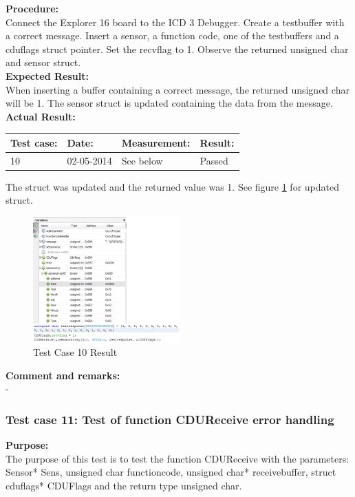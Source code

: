 \textbf{Procedure:}\\
Connect the Explorer 16 board to the ICD 3 Debugger. Create a testbuffer with a correct message. Insert a sensor, a function code, one of the testbuffers and a cduflags struct pointer. Set the recvflag to 1. Observe the returned unsigned char and sensor struct.\\

\textbf{Expected Result:}\\
When inserting a buffer containing a correct message, the returned unsigned char will be 1. The sensor struct is updated containing the data from the message.\\

\textbf{Actual Result:}\\
\begin{table}[H]
\centering
\begin{tabular}{|p{2cm}|p{2cm}|p{3cm}|p{2cm}|}\hline
\textbf{Test case:} & \textbf{Date:} & \textbf{Measurement:} & \textbf{Result:} \\ \hline
10 & 02-05-2014 & See below & Passed \\ \hline
\end{tabular}
\end{table}
The struct was updated and the returned value was 1. See figure \ref{fig:cdutestcase10} for updated struct.\\
\begin{figure}[H]
\centering
\includegraphics[width=0.5\textwidth]{billeder/CDUtestcase10}
\caption{Test Case 10 Result}
\label{fig:cdutestcase10}
\end{figure}

\textbf{Comment and remarks:}\\
-\\

\subsubsection{Test case 11: Test of function CDUReceive error handling }
\textbf{Purpose:}\\
The purpose of this test is to test the function CDUReceive with the parameters: Sensor* Sens, unsigned char functioncode, unsigned char* receivebuffer, struct cduflags* CDUFlags and the return type unsigned char.\\

